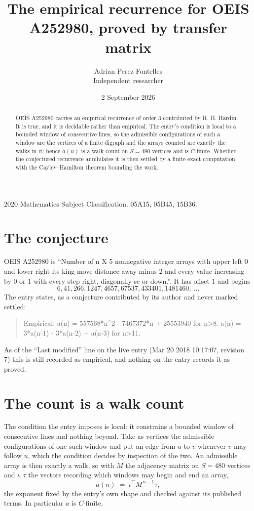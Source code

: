 \documentclass[11pt,a4paper]{article}
\title{The empirical recurrence for OEIS A252980, proved by transfer matrix}
\author{Adrian Perez Fontelles\\ \small Independent researcher}
\date{2 September 2026}
\theoremstyle{plain}
\theoremstyle{definition}
\begin{document}
\maketitle

\begin{abstract}
OEIS A252980 carries an empirical recurrence of order $3$ contributed by R. H. Hardin. It is
true, and it is decidable rather than empirical. The entry's condition is local to a bounded window of consecutive lines, so
the admissible configurations of such a window are the vertices of a finite digraph and the
arrays counted are exactly the walks in it; hence $a(n)$ is a walk count on $S=480$ vertices
and is $C$-finite. Whether the conjectured recurrence annihilates it is then settled by a
finite exact computation, with the Cayley--Hamilton theorem bounding the work.
\end{abstract}

\noindent\small 2020 Mathematics Subject Classification. 05A15, 05B45, 15B36.\normalsize

\section{The conjecture}

OEIS A252980 is ``Number of n X 5 nonnegative integer arrays with upper left 0 and lower right its king-move distance away minus 2 and every value increasing by 0 or 1 with every step right, diagonally se or down.''. It has offset $1$ and begins
\[
6, 41, 266, 1247, 4657, 67537, 433401, 1481460,\ \dots
\]
The entry states, as a conjecture contributed by its author and never marked settled:
\begin{quote}
Empirical: a(n) = 557568*n\^{}2 - 7467372*n + 25553940 for n>8. a(n) = 3*a(n-1) - 3*a(n-2) + a(n-3) for n>11.
\end{quote}
As of the ``Last modified'' line on the live entry (Mar 20 2018 10:17:07, revision 7) this is still
recorded as empirical, and nothing on the entry records it as proved.

\section{The count is a walk count}

The condition the entry imposes is local: it constrains a bounded window of consecutive lines and nothing beyond. Take as
vertices the admissible configurations of one such window and put an edge from $u$ to $v$
whenever $v$ may follow $u$, which the condition decides by inspection of the two. An
admissible array is then exactly a walk, so with $M$ the adjacency matrix on $S=480$ vertices
and $\iota,\tau$ the vectors recording which windows may begin and end an array,
\[
a(n)\;=\;\iota^{\!\top}M^{\,n-1}\tau ,
\]
the exponent fixed by the entry's own shape and checked against its published terms. In
particular $a$ is $C$-finite.
\end{document}
